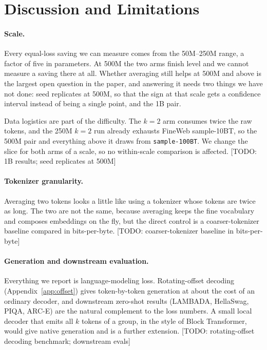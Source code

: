 \documentclass[11pt]{article}
\newcommand{\todo}[1]{\textcolor{warnred}{[TODO: #1]}}
\begin{document}
\section{Discussion and Limitations}
\label{sec:limitations}

\paragraph{Scale.}
Every equal-loss saving we can measure comes from the 50M--250M range, a factor
of five in parameters. At 500M the two arms finish level and we cannot measure
a saving there at all. Whether averaging still helps at 500M and above is the
largest open question in the paper, and answering it needs two things we have
not done: seed replicates at 500M, so that the sign at that scale gets a
confidence interval instead of being a single point, and the 1B pair.

Data logistics are part of the difficulty. The $k{=}2$ arm consumes twice the
raw tokens, and the 250M $k{=}2$ run already exhausts FineWeb sample-10BT, so
the 500M pair and everything above it draws from \texttt{sample-100BT}. We
change the slice for both arms of a scale, so no within-scale comparison is
affected. \todo{1B results; seed replicates at 500M}

\paragraph{Tokenizer granularity.}
Averaging two tokens looks a little like using a tokenizer whose tokens are
twice as long. The two are not the same, because averaging keeps the fine
vocabulary and composes embeddings on the fly, but the direct control is a
coarser-tokenizer baseline compared in bits-per-byte.
\todo{coarser-tokenizer baseline in bits-per-byte}

\paragraph{Generation and downstream evaluation.}
Everything we report is language-modeling loss. Rotating-offset decoding
(Appendix~\ref{app:offset}) gives token-by-token generation at about the cost of
an ordinary decoder, and downstream zero-shot results (LAMBADA, HellaSwag, PIQA,
ARC-E) are the natural complement to the loss numbers. A small local decoder
that emits all $k$ tokens of a group, in the style of Block Transformer, would
give native generation and is a further extension.
\todo{rotating-offset decoding benchmark; downstream evals}
\end{document}

